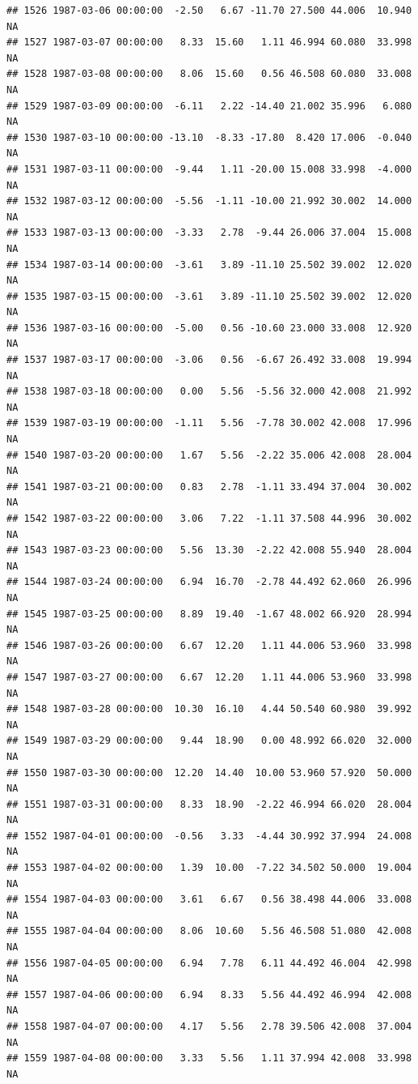 \documentclass{article}\usepackage{graphicx, color}
\makeatletter
\newenvironment{kframe}{%
 \def\at@end@of@kframe{}%
 \ifinner\ifhmode%
  \def\at@end@of@kframe{\end{minipage}}%
  \begin{minipage}{\columnwidth}%
 \fi\fi%
 \def\FrameCommand##1{\hskip\@totalleftmargin \hskip-\fboxsep
 \colorbox{shadecolor}{##1}\hskip-\fboxsep
     \hskip-\linewidth \hskip-\@totalleftmargin \hskip\columnwidth}%
 \MakeFramed {\advance\hsize-\width
   \@totalleftmargin\z@ \linewidth\hsize
   \@setminipage}}%
 {\par\unskip\endMakeFramed%
 \at@end@of@kframe}
\newenvironment{knitrout}{}{} %
\makeatother
\begin{document}
\begin{knitrout}
\begin{kframe}
\begin{verbatim}
## 1526 1987-03-06 00:00:00  -2.50   6.67 -11.70 27.500 44.006  10.940     NA
## 1527 1987-03-07 00:00:00   8.33  15.60   1.11 46.994 60.080  33.998     NA
## 1528 1987-03-08 00:00:00   8.06  15.60   0.56 46.508 60.080  33.008     NA
## 1529 1987-03-09 00:00:00  -6.11   2.22 -14.40 21.002 35.996   6.080     NA
## 1530 1987-03-10 00:00:00 -13.10  -8.33 -17.80  8.420 17.006  -0.040     NA
## 1531 1987-03-11 00:00:00  -9.44   1.11 -20.00 15.008 33.998  -4.000     NA
## 1532 1987-03-12 00:00:00  -5.56  -1.11 -10.00 21.992 30.002  14.000     NA
## 1533 1987-03-13 00:00:00  -3.33   2.78  -9.44 26.006 37.004  15.008     NA
## 1534 1987-03-14 00:00:00  -3.61   3.89 -11.10 25.502 39.002  12.020     NA
## 1535 1987-03-15 00:00:00  -3.61   3.89 -11.10 25.502 39.002  12.020     NA
## 1536 1987-03-16 00:00:00  -5.00   0.56 -10.60 23.000 33.008  12.920     NA
## 1537 1987-03-17 00:00:00  -3.06   0.56  -6.67 26.492 33.008  19.994     NA
## 1538 1987-03-18 00:00:00   0.00   5.56  -5.56 32.000 42.008  21.992     NA
## 1539 1987-03-19 00:00:00  -1.11   5.56  -7.78 30.002 42.008  17.996     NA
## 1540 1987-03-20 00:00:00   1.67   5.56  -2.22 35.006 42.008  28.004     NA
## 1541 1987-03-21 00:00:00   0.83   2.78  -1.11 33.494 37.004  30.002     NA
## 1542 1987-03-22 00:00:00   3.06   7.22  -1.11 37.508 44.996  30.002     NA
## 1543 1987-03-23 00:00:00   5.56  13.30  -2.22 42.008 55.940  28.004     NA
## 1544 1987-03-24 00:00:00   6.94  16.70  -2.78 44.492 62.060  26.996     NA
## 1545 1987-03-25 00:00:00   8.89  19.40  -1.67 48.002 66.920  28.994     NA
## 1546 1987-03-26 00:00:00   6.67  12.20   1.11 44.006 53.960  33.998     NA
## 1547 1987-03-27 00:00:00   6.67  12.20   1.11 44.006 53.960  33.998     NA
## 1548 1987-03-28 00:00:00  10.30  16.10   4.44 50.540 60.980  39.992     NA
## 1549 1987-03-29 00:00:00   9.44  18.90   0.00 48.992 66.020  32.000     NA
## 1550 1987-03-30 00:00:00  12.20  14.40  10.00 53.960 57.920  50.000     NA
## 1551 1987-03-31 00:00:00   8.33  18.90  -2.22 46.994 66.020  28.004     NA
## 1552 1987-04-01 00:00:00  -0.56   3.33  -4.44 30.992 37.994  24.008     NA
## 1553 1987-04-02 00:00:00   1.39  10.00  -7.22 34.502 50.000  19.004     NA
## 1554 1987-04-03 00:00:00   3.61   6.67   0.56 38.498 44.006  33.008     NA
## 1555 1987-04-04 00:00:00   8.06  10.60   5.56 46.508 51.080  42.008     NA
## 1556 1987-04-05 00:00:00   6.94   7.78   6.11 44.492 46.004  42.998     NA
## 1557 1987-04-06 00:00:00   6.94   8.33   5.56 44.492 46.994  42.008     NA
## 1558 1987-04-07 00:00:00   4.17   5.56   2.78 39.506 42.008  37.004     NA
## 1559 1987-04-08 00:00:00   3.33   5.56   1.11 37.994 42.008  33.998     NA

\end{verbatim}
\end{kframe}
\end{knitrout}
\end{document}
